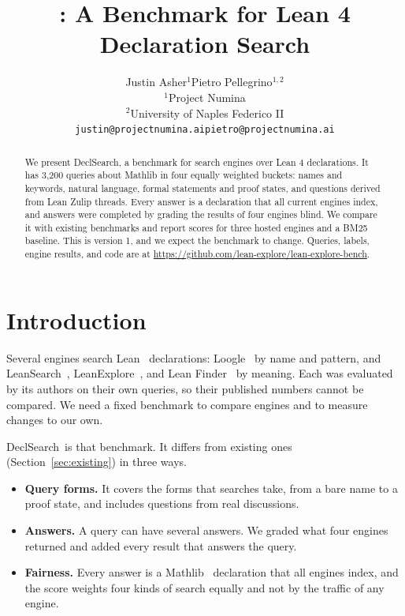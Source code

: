 \documentclass{article}
\title{\bench: A Benchmark for Lean 4 Declaration Search}
\author{%
  Justin Asher$^{1}$\hspace{1.4em}Pietro Pellegrino$^{1,2}$ \\[1.2ex]
  \small\normalfont $^{1}$Project Numina \\[0.3ex]
  \small\normalfont $^{2}$University of Naples Federico II \\[0.8ex]
  \small\normalfont \texttt{justin@projectnumina.ai}\hspace{1.4em}\texttt{pietro@projectnumina.ai}
}
\newcommand{\bench}{DeclSearch}
\begin{document}
\maketitle

\begin{abstract}
We present \bench, a benchmark for search engines over Lean 4 declarations. It
has 3,200 queries about Mathlib in four equally weighted buckets: names and
keywords, natural language, formal statements and proof states, and questions
derived from Lean Zulip threads. Every answer is a declaration that all
current engines index, and answers were completed by grading the results of
four engines blind. We compare it with existing benchmarks and report scores
for three hosted engines and a BM25 baseline. This is version 1, and we expect
the benchmark to change. Queries, labels, engine results, and code are at
\url{https://github.com/lean-explore/lean-explore-bench}.
\end{abstract}

\section{Introduction}

Several engines search Lean~\cite{moura2021lean4} declarations:
Loogle~\cite{breitner2023loogle} by name and pattern, and
LeanSearch~\cite{gao2024leansearch,gao2026leansearchv2},
LeanExplore~\cite{asher2025leanexplore}, and Lean
Finder~\cite{lu2025leanfinder} by meaning. Each was evaluated by its authors
on their own queries, so their published numbers cannot be compared. We need a
fixed benchmark to compare engines and to measure changes to our own.

\bench\ is that benchmark. It differs from existing ones
(Section~\ref{sec:existing}) in three ways.
\begin{itemize}
\item \textbf{Query forms.} It covers the forms that searches take, from a
bare name to a proof state, and includes questions from real discussions.
\item \textbf{Answers.} A query can have several answers. We graded what four
engines returned and added every result that answers the query.
\item \textbf{Fairness.} Every answer is a Mathlib~\cite{mathlib2019}
declaration that all engines index, and the score weights four kinds of search
equally and not by the traffic of any engine.
\end{itemize}
\end{document}
